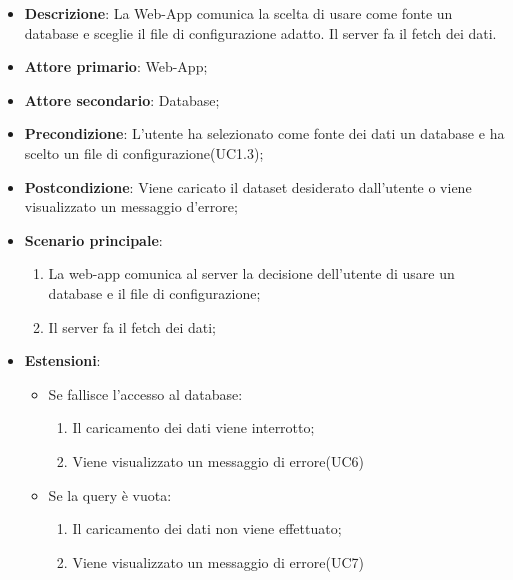 \begin{itemize}

	\item \textbf{Descrizione}: La Web-App comunica la scelta di usare come fonte un database e sceglie il file di configurazione adatto. Il server fa il fetch dei dati.
	
    \item \textbf{Attore primario}: Web-App;
	\item \textbf{Attore secondario}: Database;
	        
    \item \textbf{Precondizione}:   L'utente ha selezionato come fonte dei dati un database e ha scelto un file di configurazione(UC1.3);

    \item \textbf{Postcondizione}:  Viene caricato il dataset desiderato dall'utente o viene visualizzato un messaggio d'errore;

	\item \textbf{Scenario principale}:
		\begin{enumerate}
			\item La web-app comunica al server la decisione dell'utente di usare un database e il file di configurazione;
            \item Il server fa il fetch dei dati;
        \end{enumerate}
		
	\item \textbf{Estensioni}:
		\begin{itemize}
		
			\item Se fallisce l'accesso al database:
			\begin{enumerate}
				
				\item Il caricamento dei dati viene interrotto;
				\item Viene visualizzato un messaggio di errore(UC6)
				
			\end{enumerate}
		
			\item Se la query è vuota:
			\begin{enumerate}
				
				\item Il caricamento dei dati non viene effettuato;
				\item Viene visualizzato un messaggio di errore(UC7)
				
			\end{enumerate}
		
		\end{itemize}
			
\end{itemize}